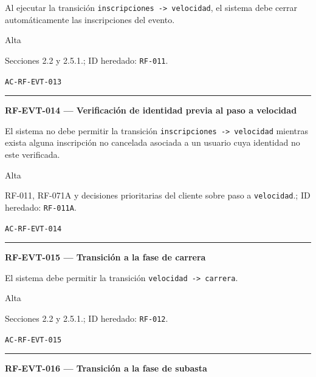 \documentclass[10pt,letterpaper]{article}
\begin{document}
\begin{description}[style=nextline,leftmargin=3.15cm,labelwidth=2.8cm,font=\normalfont\bfseries]
\item[Obligación] Al ejecutar la transición \texttt{inscripciones -> velocidad}, el sistema debe cerrar automáticamente las inscripciones del evento.
\item[Prioridad] Alta
\item[Procedencia] Secciones 2.2 y 2.5.1.; ID heredado: \texttt{RF-011}.
\item[Verificación] \texttt{AC-RF-EVT-013}
\end{description}
\vspace{0.25em}\hrule\vspace{0.65em}
\noindent\textbf{RF-EVT-014 --- Verificación de identidad previa al paso a velocidad}\par
\begin{description}[style=nextline,leftmargin=3.15cm,labelwidth=2.8cm,font=\normalfont\bfseries]
\item[Obligación] El sistema no debe permitir la transición \texttt{inscripciones -> velocidad} mientras exista alguna inscripción no cancelada asociada a un usuario cuya identidad no este verificada.
\item[Prioridad] Alta
\item[Procedencia] RF-011, RF-071A y decisiones prioritarias del cliente sobre paso a \texttt{velocidad}.; ID heredado: \texttt{RF-011A}.
\item[Verificación] \texttt{AC-RF-EVT-014}
\end{description}
\vspace{0.25em}\hrule\vspace{0.65em}
\noindent\textbf{RF-EVT-015 --- Transición a la fase de carrera}\par
\begin{description}[style=nextline,leftmargin=3.15cm,labelwidth=2.8cm,font=\normalfont\bfseries]
\item[Obligación] El sistema debe permitir la transición \texttt{velocidad -> carrera}.
\item[Prioridad] Alta
\item[Procedencia] Secciones 2.2 y 2.5.1.; ID heredado: \texttt{RF-012}.
\item[Verificación] \texttt{AC-RF-EVT-015}
\end{description}
\vspace{0.25em}\hrule\vspace{0.65em}
\noindent\textbf{RF-EVT-016 --- Transición a la fase de subasta}\par
\end{document}
